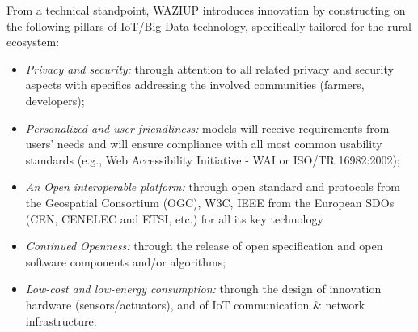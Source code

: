 From a technical standpoint, WAZIUP introduces innovation by constructing on the following pillars of IoT/Big Data technology, specifically tailored for the rural ecosystem:
\begin{itemize}
  \item \emph{Privacy and security:} through attention to all related privacy and security aspects with specifics addressing the involved communities (farmers, developers);
  \item \emph{Personalized and user friendliness:} models will receive requirements from users’ needs and will ensure compliance with all most common usability standards (e.g., Web Accessibility Initiative - WAI or ISO/TR 16982:2002);
  \item \emph{An Open interoperable platform:} through open standard and protocols from the Geospatial Consortium (OGC), W3C, IEEE from the European SDOs (CEN, CENELEC and ETSI, etc.) for all its key technology
  \item \emph{Continued Openness:} through the release of open specification and open software components and/or algorithms;
  \item \emph{Low-cost and low-energy consumption:} through the design of innovation hardware (sensors/actuators), and of IoT communication \& network infrastructure.
\end{itemize}


